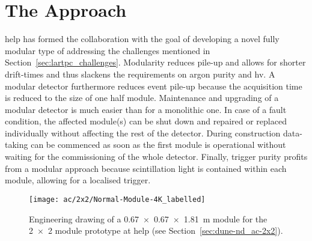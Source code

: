 \section{The \AC{} Approach}
\label{sec:ac_argoncube}

\gls{help} has formed the \AC{} collaboration with the goal of developing a novel fully modular type of \lartpc{} addressing the challenges mentioned in Section~\ref{sec:lartpc_challenges}.
Modularity reduces pile-up and allows for shorter drift-times and thus slackens the requirements on argon purity and \gls{hv}.
A modular detector furthermore reduces event pile-up because the acquisition time is reduced to the size of one half module.
Maintenance and upgrading of a modular detector is much easier than for a monolithic one.
In case of a fault condition, the affected module(s) can be shut down and repaired or replaced individually without affecting the rest of the detector.
During construction data-taking can be commenced as soon as the first module is operational without waiting for the commissioning of the whole detector.
Finally, trigger purity profits from a modular approach because scintillation light is contained within each module, allowing for a localised trigger.

\begin{figure}[tbp]
	\centering
	\texttt{[image: ac/2x2/Normal-Module-4K\_labelled]}
	\caption[\AC{} module engineering drawing]{%
		Engineering drawing of a \SI{0.67 x 0.67 x 1.81}{\metre} \AC{} module for the \num{2 x 2} module prototype at \acrshort{help} (see Section~\ref{sec:dune-nd_ac-2x2}).
	}
	\label{fig:ac_module}
\end{figure}


